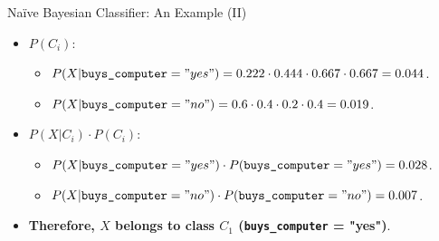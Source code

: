 \begin{frame}{Naïve Bayesian Classifier: An Example (II)}
	\begin{itemize}
		\item $P(C_i)$:
		      \begin{itemize}
			      \item $P(X | \texttt{buys\_computer} = "yes") = 0.222 \cdot 0.444 \cdot 0.667 \cdot 0.667 = 0.044$.
			      \item $P(X | \texttt{buys\_computer} = "no") = 0.6 \cdot 0.4 \cdot 0.2 \cdot 0.4 = 0.019$.
		      \end{itemize}
		\item $P(X | C_i) \cdot P(C_i)$:
		      \begin{itemize}
			      \item $P(X | \texttt{buys\_computer} = "yes") \cdot  P(\texttt{buys\_computer} = "yes") = 0.028$.
			      \item $P(X | \texttt{buys\_computer} = "no") \cdot  P(\texttt{buys\_computer} = "no") = 0.007$.
		      \end{itemize}
		\item \textbf{Therefore, $X$ belongs to class $C_1$ (\texttt{buys\_computer} = "yes")}.
	\end{itemize}
\end{frame}

